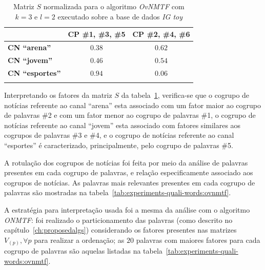 \documentclass[
    12pt,                %
    oneside,            %
    a4paper,            %
    english,            %
    brazil                %
    ]{abntex2ppgsi}
\begin{document}
\begin{table}[H]
\centering
    \caption{Matriz $S$ normalizada para o algoritmo \textit{OvNMTF} com $k = 3$ e $l = 2$ executado sobre a base de dados \textit{IG toy}}
    \begin{tabular}{lcc}
        \hline
        & \textbf{CP \#1, \#3, \#5} & \textbf{CP \#2, \#4, \#6} \\
        \hline
        \textbf{CN ``arena''}    & $\mathbf{0.38}$ & $\mathbf{0.62}$ \\
        \textbf{CN ``jovem''}    & $\mathbf{0.46}$ & $\mathbf{0.54}$ \\
        \textbf{CN ``esportes''} & $\mathbf{0.94}$ & $0.06$ \\
        \hline \\
    \end{tabular}
    \label{tab:ovnmtf:matrizS}
\end{table}

Interpretando os fatores da matriz $S$ da tabela~\ref{tab:ovnmtf:matrizS}, verifica-se que o cogrupo de notícias referente ao canal ``arena'' esta associado com um fator maior ao cogrupo de palavras \#2 e com um fator menor ao cogrupo de palavras \#1, o cogrupo de notícias referente ao canal ``jovem'' esta associado com fatores similares aos cogrupos de palavras \#3 e \#4, e o cogrupo de notícias referente ao canal ``esportes'' é caracterizado, principalmente, pelo cogrupo de palavras \#5.

A rotulação dos cogrupos de notícias foi feita por meio da análise de palavras presentes em cada cogrupo de palavras, e relação especificamente associado aos cogrupos de notícias.
As palavras mais relevantes presentes em cada cogrupo de palavras são mostradas na tabela~\ref{tab:experiments-quali-words:ovnmtf}.

A estratégia para interpretação usada foi a mesma da análise com o algoritmo \textit{ONMTF}: foi realizado o particionamento das palavras (como descrito no capítulo~\ref{ch:proposedalgs}) considerando os fatores presentes nas matrizes $V_{(p)}, \forall p$ para realizar a ordenação; as $20$ palavras com maiores fatores para cada cogrupo de palavras são aquelas listadas na tabela~\ref{tab:experiments-quali-words:ovnmtf}.

\end{document}
